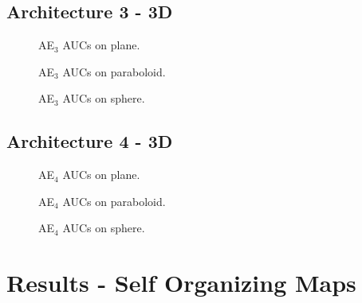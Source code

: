 \subsection{Architecture 3 - 3D}
\label{subsec:results_ae_3}
\begin{figure}[h!]
         \centering
         
         \caption{AE$_3$ AUCs on plane.}
\end{figure}
\begin{figure}[h!]
         \centering
         
         \caption{AE$_3$ AUCs on paraboloid.}
\end{figure}
\begin{figure}[h!]
         \centering
         
         \caption{AE$_3$ AUCs on sphere.}
\end{figure}
\clearpage

\subsection{Architecture 4 - 3D}
\label{subsec:results_ae_4}
\begin{figure}[h!]
         \centering
         
         \caption{AE$_4$ AUCs on plane.}
\end{figure}
\begin{figure}[h!]
         \centering
         
         \caption{AE$_4$ AUCs on paraboloid.}
\end{figure}
\begin{figure}[h!]
         \centering
         
         \caption{AE$_4$ AUCs on sphere.}
\end{figure}
\clearpage

\section{Results - Self Organizing Maps}


